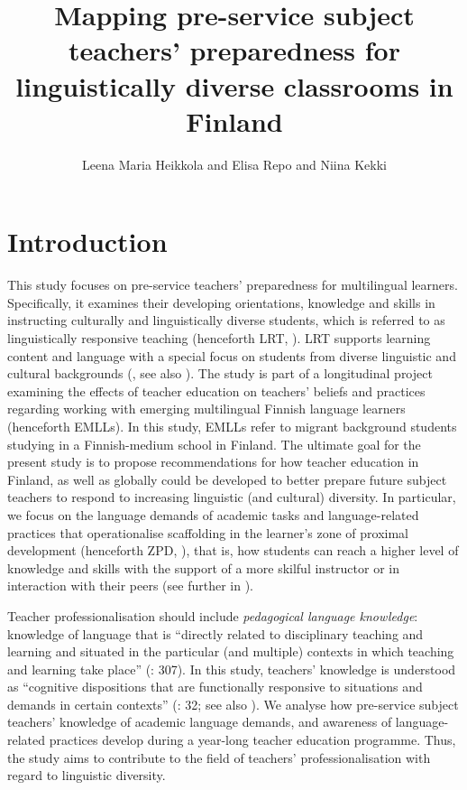 \documentclass[output=paper]{langscibook}
\author{Leena Maria Heikkola\orcid{}\affiliation{UiT The Arctic University of Norway} and Elisa Repo\orcid{}\affiliation{University of Jyväskylä} and Niina Kekki\orcid{}\affiliation{University of Turku}}
\title[Mapping teachers’ preparedness for linguistically diverse classrooms]{Mapping pre-service subject teachers’ preparedness for linguistically diverse classrooms in Finland}
\begin{document}
\maketitle 
\label{chap:8}




\section{Introduction}\label{sec:heikkola:1}

This study focuses on pre-service teachers’ preparedness for multilingual learners. Specifically, it examines their developing orientations, knowledge and skills in instructing culturally and linguistically diverse students, which is referred to as linguistically responsive teaching (henceforth LRT, \citealt{LucasVillegas2013}). LRT supports learning content and language with a special focus on students from diverse linguistic and cultural backgrounds (\citealt{LucasVillegas2013}, see also ). The study is part of a longitudinal project examining the effects of teacher education on teachers’ beliefs and practices regarding working with emerging multilingual Finnish language learners (henceforth EMLLs). In this study, EMLLs refer to migrant background students studying in a Finnish-medium school in Finland. The ultimate goal for the present study is to propose recommendations for how teacher education in Finland, as well as globally could be developed to better prepare future subject teachers to respond to increasing linguistic (and cultural) diversity. In particular, we focus on the language demands of academic tasks and language-related practices that operationalise scaffolding in the learner’s zone of proximal development (henceforth ZPD, \citealt{Vygotsky1978}), that is, how students can reach a higher level of knowledge and skills with the support of a more skilful instructor or in interaction with their peers (see further in ).

Teacher professionalisation should include \textit{pedagogical language knowledge}: knowledge of language that is “directly related to disciplinary teaching and learning and situated in the particular (and multiple) contexts in which teaching and learning take place” (\citealt{Bunch2013}: 307). In this study, teachers’ knowledge is understood as “cognitive dispositions that are functionally responsive to situations and demands in certain contexts” (\citealt{Kaiser2019-1}: 32; see also \citealt{KliemeEtAl2008}). We analyse how pre-service subject teachers’ knowledge of academic language demands, and awareness of language-related practices develop during a year-long teacher education programme. Thus, the study aims to contribute to the field of teachers’ professionalisation with regard to linguistic diversity.
\end{document}
